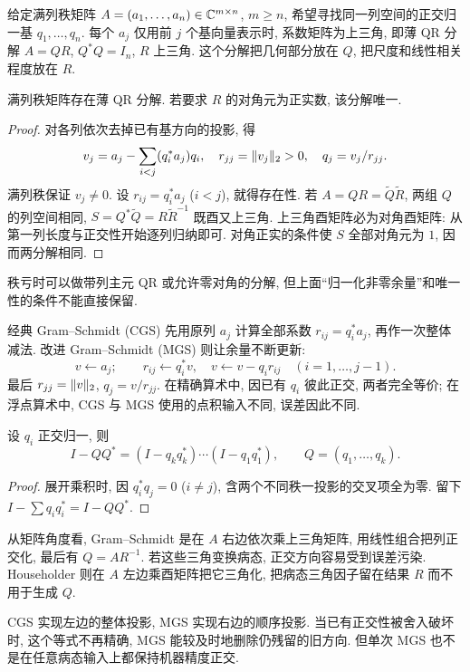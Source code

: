 \label{ch:qr}
给定满列秩矩阵 $A=(a_1,\ldots,a_n)\in\mathbb C^{m\times n}$, $m\ge n$, 希望寻找同一列空间的正交归一基 $q_1,\ldots,q_n$. 每个 $a_j$ 仅用前 $j$ 个基向量表示时, 系数矩阵为上三角, 即薄 QR 分解 $A=QR$, $Q^*Q=I_n$, $R$ 上三角. 这个分解把几何部分放在 $Q$, 把尺度和线性相关程度放在 $R$.

\begin{theorem}
满列秩矩阵存在薄 QR 分解. 若要求 $R$ 的对角元为正实数, 该分解唯一.
\end{theorem}
\begin{proof}
对各列依次去掉已有基方向的投影, 得
\[
v_j=a_j-\sum_{i<j}(q_i^*a_j)q_i,\quad
r_{jj}=\lVert v_j\rVert_2>0,\quad q_j=v_j/r_{jj}.
\]
满列秩保证 $v_j\ne0$. 设 $r_{ij}=q_i^*a_j$ ($i<j$), 就得存在性. 若 $A=QR=\widetilde Q\widetilde R$, 两组 $Q$ 的列空间相同, $S=Q^*\widetilde Q=R\widetilde R^{-1}$ 既酉又上三角. 上三角酉矩阵必为对角酉矩阵: 从第一列长度与正交性开始逐列归纳即可. 对角正实的条件使 $S$ 全部对角元为 $1$, 因而两分解相同.
\end{proof}
秩亏时可以做带列主元 QR 或允许零对角的分解, 但上面“归一化非零余量”和唯一性的条件不能直接保留.

经典 Gram--Schmidt (CGS) 先用原列 $a_j$ 计算全部系数 $r_{ij}=q_i^*a_j$, 再作一次整体减法. 改进 Gram--Schmidt (MGS) 则让余量不断更新:
\[
v\leftarrow a_j;\qquad
r_{ij}\leftarrow q_i^*v,\quad v\leftarrow v-q_i r_{ij}
\quad (i=1,\ldots,j-1).
\]
最后 $r_{jj}=\lVert v\rVert_2$, $q_j=v/r_{jj}$. 在精确算术中, 因已有 $q_i$ 彼此正交, 两者完全等价; 在浮点算术中, CGS 与 MGS 使用的点积输入不同, 误差因此不同.

\begin{proposition}
设 $q_i$ 正交归一, 则
\[
I-QQ^*=(I-q_kq_k^*)\cdots(I-q_1q_1^*),\qquad
Q=(q_1,\ldots,q_k).
\]
\end{proposition}
\begin{proof}
展开乘积时, 因 $q_i^*q_j=0$ ($i\ne j$), 含两个不同秩一投影的交叉项全为零. 留下 $I-\sum q_iq_i^*=I-QQ^*$.
\end{proof}
从矩阵角度看, Gram--Schmidt 是在 $A$ 右边依次乘上三角矩阵, 用线性组合把列正交化, 最后有 $Q=AR^{-1}$. 若这些三角变换病态, 正交方向容易受到误差污染. Householder 则在 $A$ 左边乘酉矩阵把它三角化, 把病态三角因子留在结果 $R$ 而不用于生成 $Q$.

CGS 实现左边的整体投影, MGS 实现右边的顺序投影. 当已有正交性被舍入破坏时, 这个等式不再精确, MGS 能较及时地删除仍残留的旧方向. 但单次 MGS 也不是在任意病态输入上都保持机器精度正交.

